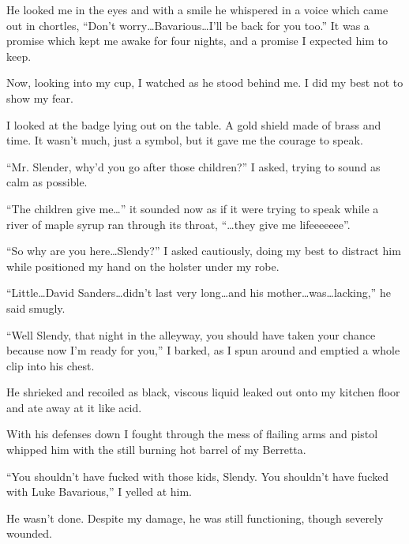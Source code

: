 He looked me in the eyes and with a smile he whispered in a voice
which came out in chortles, ``Don't
worry{\ldots}Bavarious{\ldots}I'll be back for you
too.'' It was a promise which kept me awake for four nights,
and a promise I expected him to keep.



Now, looking into my cup, I watched as he stood behind me. I did my
best not to show my fear.



I looked at the badge lying out on the table. A gold shield made of
brass and time. It wasn't much, just a symbol, but it gave me
the courage to speak.



``Mr. Slender, why'd you go after those children?''
I asked, trying to sound as calm as possible.



``The children give me{\ldots}'' it sounded now as if it
were trying to speak while a river of maple syrup ran through its
throat, ``{\ldots}they give me lifeeeeeee''.



``So why are you here{\ldots}Slendy?'' I asked
cautiously, doing my best to distract him while positioned my hand
on the holster under my robe.



``Little{\ldots}David Sanders{\ldots}didn't last very
long{\ldots}and his mother{\ldots}was{\ldots}lacking,'' he
said smugly.



``Well Slendy, that night in the alleyway, you should have
taken your chance because now I'm ready for you,'' I
barked, as I spun around and emptied a whole clip into his
chest.



He shrieked and recoiled as black, viscous liquid leaked out onto
my kitchen floor and ate away at it like acid.



With his defenses down I fought through the mess of flailing arms
and pistol whipped him with the still burning hot barrel of my
Berretta.



``You shouldn't have fucked with those kids, Slendy. You
shouldn't have fucked with Luke Bavarious,'' I yelled at
him.



He wasn't done. Despite my damage, he was still functioning,
though severely wounded.



